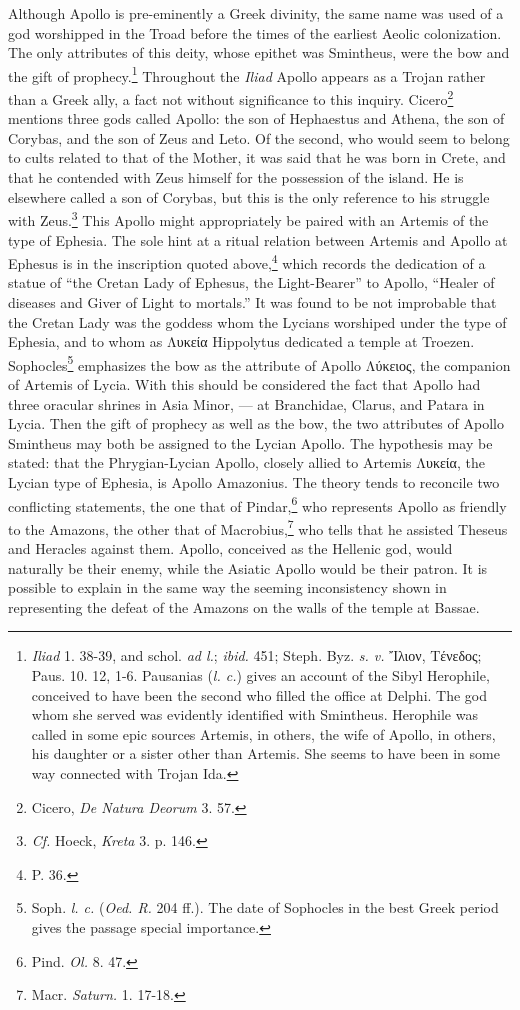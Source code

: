 \documentclass[a4paper, 12pt, oneside]{article}
\begin{document}
Although Apollo is pre-eminently a Greek divinity, the same name was used of a god worshipped in the Troad before the times of the earliest Aeolic colonization. The only attributes of this deity, whose epithet was Smintheus, were the bow and the gift of prophecy.\footnote{\emph{Iliad} 1. 38-39, and schol. \emph{ad l.}; \emph{ibid.} 451; Steph. Byz. \emph{s. v.} Ἴλιον, Τένεδος; Paus. 10. 12, 1-6. Pausanias (\emph{l. c.}) gives an account of the Sibyl Herophile, conceived to have been the second who filled the office at Delphi. The god whom she served was evidently identified with Smintheus. Herophile was called in some epic sources Artemis, in others, the wife of Apollo, in others, his daughter or a sister other than Artemis. She seems to have been in some way connected with Trojan Ida.} Throughout the \emph{Iliad} Apollo appears as a Trojan rather than a Greek ally, a fact not without significance to this inquiry. Cicero\footnote{Cicero, \emph{De Natura Deorum} 3. 57.} mentions three gods called Apollo: the son of Hephaestus and Athena, the son of Corybas, and the son of Zeus and Leto. Of the second, who would seem to belong to cults related to that of the Mother, it was said that he was born in Crete, and that he contended with Zeus himself for the possession of the island. He is elsewhere called a son of Corybas, but this is the only reference to his struggle with Zeus.\footnote{\emph{Cf.} Hoeck, \emph{Kreta} 3. p. 146.} This Apollo might appropriately be paired with an Artemis of the type of Ephesia. The sole hint at a ritual relation between Artemis and Apollo at Ephesus is in the inscription quoted above,\footnote{P. 36.} which records the dedication of a statue of ``the Cretan Lady of Ephesus, the Light-Bearer'' to Apollo, ``Healer of diseases and Giver of Light to mortals.'' It was found to be not improbable that the Cretan Lady was the goddess whom the Lycians worshiped under the type of Ephesia, and to whom as Λυκεία Hippolytus dedicated a temple at Troezen. Sophocles\footnote{Soph. \emph{l. c.} (\emph{Oed. R.} 204 ff.). The date of Sophocles in the best Greek period gives the passage special importance.} emphasizes the bow as the attribute of Apollo Λύκειος, the companion of Artemis of Lycia. With this should be considered the fact that Apollo had three oracular shrines in Asia Minor, --- at Branchidae, Clarus, and Patara in Lycia. Then the gift of prophecy as well as the bow, the two attributes of Apollo Smintheus may both be assigned to the Lycian Apollo. The hypothesis may be stated: that the Phrygian-Lycian Apollo, closely allied to Artemis Λυκεία, the Lycian type of Ephesia, is Apollo Amazonius. The theory tends to reconcile two conflicting statements, the one that of Pindar,\footnote{Pind. \emph{Ol.} 8. 47.} who represents Apollo as friendly to the Amazons, the other that of Macrobius,\footnote{Macr. \emph{Saturn.} 1. 17-18.} who tells that he assisted Theseus and Heracles against them. Apollo, conceived as the Hellenic god, would naturally be their enemy, while the Asiatic Apollo would be their patron. It is possible to explain in the same way the seeming inconsistency shown in representing the defeat of the Amazons on the walls of the temple at Bassae.
\end{document}
